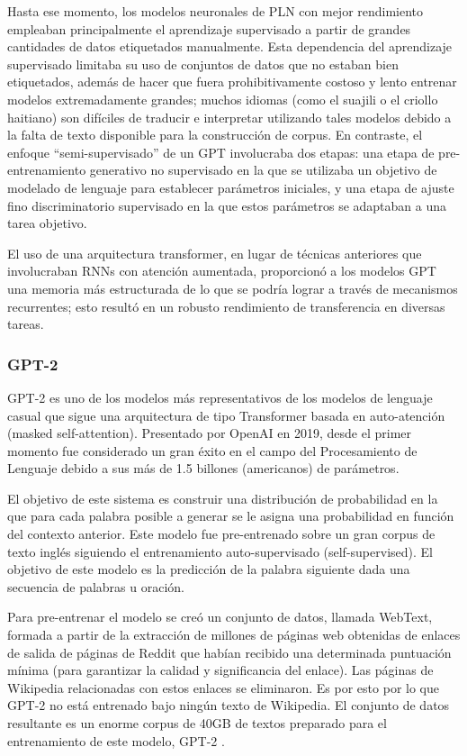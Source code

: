 Hasta ese momento, los modelos neuronales de PLN con mejor rendimiento empleaban principalmente el aprendizaje supervisado a partir de grandes cantidades de datos etiquetados manualmente. Esta dependencia del aprendizaje supervisado limitaba su uso de conjuntos de datos que no estaban bien etiquetados, además de hacer que fuera prohibitivamente costoso y lento entrenar modelos extremadamente grandes; muchos idiomas (como el suajili o el criollo haitiano) son difíciles de traducir e interpretar utilizando tales modelos debido a la falta de texto disponible para la construcción de corpus. En contraste, el enfoque ``semi-supervisado'' de un GPT involucraba dos etapas: una etapa de pre-entrenamiento generativo no supervisado en la que se utilizaba un objetivo de modelado de lenguaje para establecer parámetros iniciales, y una etapa de ajuste fino discriminatorio supervisado en la que estos parámetros se adaptaban a una tarea objetivo.

El uso de una arquitectura transformer, en lugar de técnicas anteriores que involucraban RNNs con atención aumentada, proporcionó a los modelos GPT una memoria más estructurada de lo que se podría lograr a través de mecanismos recurrentes; esto resultó en un robusto rendimiento de transferencia en diversas tareas.

\subsubsection{GPT-2}

GPT-2 es uno de los modelos más representativos de los modelos de lenguaje casual que sigue una arquitectura de tipo Transformer basada en auto-atención (masked self-attention). Presentado por OpenAI en 2019, desde el primer momento fue considerado un gran éxito en el campo del Procesamiento de Lenguaje debido a sus más de 1.5 billones (americanos) de parámetros.

El objetivo de este sistema es construir una distribución de probabilidad en la que para cada palabra posible a generar se le asigna una probabilidad en función del contexto anterior. Este modelo fue pre-entrenado sobre un gran corpus de texto inglés siguiendo el entrenamiento auto-supervisado (self-supervised). El objetivo de este modelo es la predicción de la palabra siguiente dada una secuencia de palabras u oración.

Para pre-entrenar el modelo se creó un conjunto de datos, llamada WebText, formada a partir de la extracción de millones de páginas web obtenidas de enlaces de salida de páginas de Reddit que habían recibido una determinada puntuación mínima (para garantizar la calidad y significancia del enlace). Las páginas de Wikipedia relacionadas con estos enlaces se eliminaron. Es por esto por lo que GPT-2 no está entrenado bajo ningún texto de Wikipedia. El conjunto de datos resultante es un enorme corpus de 40GB de textos preparado para el entrenamiento de este modelo, GPT-2 \cite{radford2019language}.

